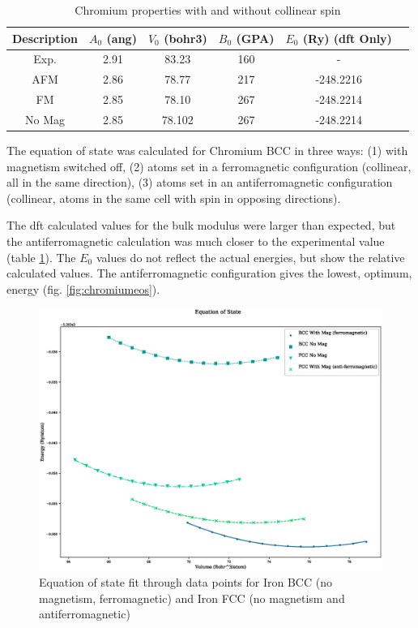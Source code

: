 \FloatBarrier
\begin{table}[h]
\begin{center}
\renewcommand{\arraystretch}{1.2}
\begin{tabular}{c c c c c c}
\hline\hline
Description & $A_0$ (ang) & $V_0$ (bohr3) & $B_0$ (GPA) & $E_0$ (Ry) (\acrshort{dft} Only) \\
\hline\hline
Exp. & 2.91 & 83.23 & 160 & - \\
AFM & 2.86 & 78.77 & 217 & -248.2216 \\
FM & 2.85 & 78.10 & 267 & -248.2214 \\
No Mag & 2.85 & 78.102 & 267 & -248.2214 \\
\hline\hline
\end{tabular}
\end{center}
\caption{Chromium properties with and without collinear spin}
\label{table:crproperties}
\end{table}
\FloatBarrier

The equation of state was calculated for Chromium BCC in three ways: (1) with magnetism switched off, (2) atoms set in a ferromagnetic configuration (collinear, all in the same direction), (3) atoms set in an antiferromagnetic configuration (collinear, atoms in the same cell with spin in opposing directions).  

The \acrshort{dft} calculated values for the bulk modulus were larger than expected, but the antiferromagnetic calculation was much closer to the experimental value (table \ref{table:crproperties}).  The $E_0$ values do not reflect the actual energies, but show the relative calculated values.  The antiferromagnetic configuration gives the lowest, optimum, energy (fig. \ref{fig:chromiumeos}).

\FloatBarrier
\begin{figure}[h]
\begin{center}
\includegraphics[scale=0.45]{chapters/potentials_fe_pd_ru/qeeos_plots/fe-mag/iron_eos_comparison.eps}
\caption{Equation of state fit through data points for Iron BCC (no magnetism, ferromagnetic) and Iron FCC (no magnetism and antiferromagnetic)}
\label{fig:iron_bcc_fcc_eos}
\end{center}
\end{figure}
\FloatBarrier


